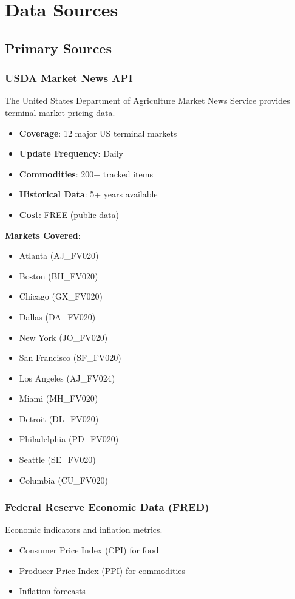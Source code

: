 \documentclass[11pt,a4paper]{article}
\begin{document}
\section{Data Sources}

\subsection{Primary Sources}

\subsubsection{USDA Market News API}
The United States Department of Agriculture Market News Service provides terminal market pricing data.

\begin{itemize}
    \item \textbf{Coverage}: 12 major US terminal markets
    \item \textbf{Update Frequency}: Daily
    \item \textbf{Commodities}: 200+ tracked items
    \item \textbf{Historical Data}: 5+ years available
    \item \textbf{Cost}: FREE (public data)
\end{itemize}

\textbf{Markets Covered}:
\begin{itemize}
    \item Atlanta (AJ\_FV020)
    \item Boston (BH\_FV020)
    \item Chicago (GX\_FV020)
    \item Dallas (DA\_FV020)
    \item New York (JO\_FV020)
    \item San Francisco (SF\_FV020)
    \item Los Angeles (AJ\_FV024)
    \item Miami (MH\_FV020)
    \item Detroit (DL\_FV020)
    \item Philadelphia (PD\_FV020)
    \item Seattle (SE\_FV020)
    \item Columbia (CU\_FV020)
\end{itemize}

\subsubsection{Federal Reserve Economic Data (FRED)}
Economic indicators and inflation metrics.
\begin{itemize}
    \item Consumer Price Index (CPI) for food
    \item Producer Price Index (PPI) for commodities
    \item Inflation forecasts
\end{itemize}
\end{document}
